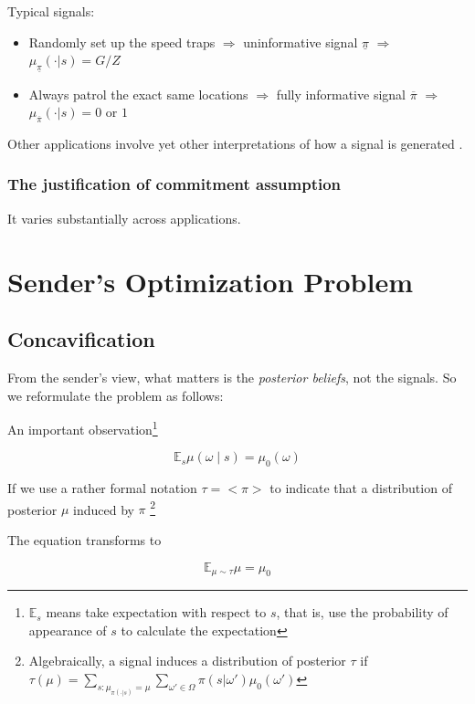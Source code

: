 \documentclass[12pt,letterpaper]{article}
\theoremstyle{definition}   %
\begin{document}
Typical signals:
\begin{itemize}
	\item Randomly set up the speed traps $\Rightarrow$ uninformative signal $\underline{\pi}$ $\Rightarrow$ $\mu_{\underline{\pi}}( \cdot | s) = G/Z$
	\item Always patrol the exact same locations $\Rightarrow$ fully informative signal $\overline{\pi}$ $\Rightarrow$ $\mu_{\overline{\pi}}( \cdot | s) = 0\text{ or }1$
\end{itemize}

Other applications involve yet other interpretations of how a signal is generated \citep*{best2020persuasion}.


\subsubsection*{The justification of commitment assumption}

It varies substantially across applications.







\section{Sender's Optimization Problem}

\subsection{Concavification}

From the sender's view, what matters is the \emph{posterior beliefs}, not the signals. So we reformulate the problem as follows:

An important observation\footnote{$\mathbb{E}_s$ means take expectation with respect to $s$, that is, use the probability of appearance of $s$ to calculate the expectation}

\[\mathbb{E}_s  \mu(\omega \mid s) = \mu_0 (\omega)\]


If we use a rather formal notation 
$\tau = <\pi>$ to indicate that a distribution of posterior $\mu$ induced by $\pi$ 
\footnote{Algebraically, 
a signal induces a distribution of posterior 
$\tau$ if $\tau(\mu) = \sum_{s:\mu_{\pi(\cdot|s)} = \mu} \sum_{\omega' \in \Omega} \pi(s | \omega') \mu_0(\omega')$}


The equation transforms to 

\[\mathbb{E}_{\mu \sim \tau}  \mu = \mu_0\]
\end{document}
